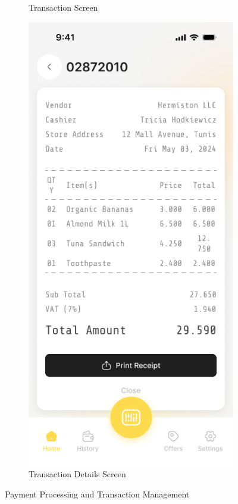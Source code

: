 \begin{figure}[H]
\begin{subfigure}[b]{0.32\textwidth}
        \caption{Transaction Screen}
        \label{fig:transaction_screen}
    \end{subfigure}
    \hfill
    \begin{subfigure}[b]{0.32\textwidth}
        \centering
        \includegraphics[width=\textwidth]{images/transaction_details_screen.png}
        \caption{Transaction Details Screen}
        \label{fig:transaction_details_screen}
    \end{subfigure}
    \caption{Payment Processing and Transaction Management}
    \label{fig:payment_flow}
\end{figure}

